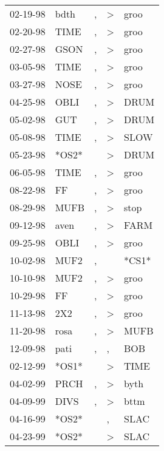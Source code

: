 \begin{supertabular}{lllll}
 02-19-98 &   bdth &             , &  \textgreater &   groo \\
 02-20-98 &   TIME &             , &  \textgreater &   groo \\
 02-27-98 &   GSON &             , &  \textgreater &   groo \\
 03-05-98 &   TIME &             , &  \textgreater &   groo \\
 03-27-98 &   NOSE &             , &  \textgreater &   groo \\
 04-25-98 &   OBLI &             , &  \textgreater &   DRUM \\
 05-02-98 &    GUT &             , &  \textgreater &   DRUM \\
 05-08-98 &   TIME &             , &  \textgreater &   SLOW \\
 05-23-98 &  *OS2* &               &  \textgreater &   DRUM \\
 06-05-98 &   TIME &             , &  \textgreater &   groo \\
 08-22-98 &     FF &             , &  \textgreater &   groo \\
 08-29-98 &   MUFB &             , &  \textgreater &   stop \\
 09-12-98 &   aven &             , &  \textgreater &   FARM \\
 09-25-98 &   OBLI &             , &  \textgreater &   groo \\
 10-02-98 &   MUF2 &             , &               &  *CS1* \\
 10-10-98 &   MUF2 &             , &  \textgreater &   groo \\
 10-29-98 &     FF &             , &  \textgreater &   groo \\
 11-13-98 &    2X2 &             , &  \textgreater &   groo \\
 11-20-98 &   rosa &             , &  \textgreater &   MUFB \\
 12-09-98 &   pati &             , &             , &    BOB \\
 02-12-99 &  *OS1* &               &  \textgreater &   TIME \\
 04-02-99 &   PRCH &             , &  \textgreater &   byth \\
 04-09-99 &   DIVS &             , &  \textgreater &   bttm \\
 04-16-99 &  *OS2* &               &             , &   SLAC \\
 04-23-99 &  *OS2* &               &  \textgreater &   SLAC \\

\end{supertabular}
